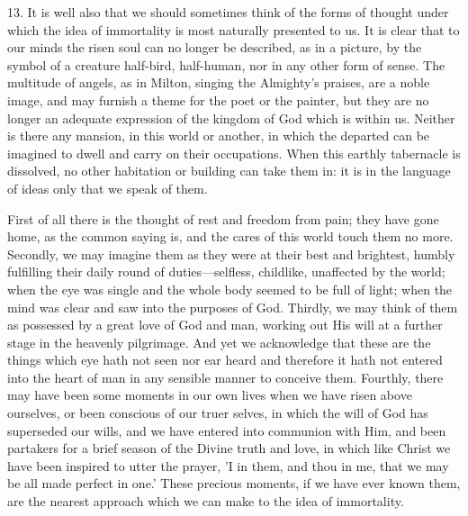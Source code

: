 \documentclass[11pt,letter]{article}
\begin{document}
\par  13. It is well also that we should sometimes think of the forms of thought under which the idea of immortality is most naturally presented to us. It is clear that to our minds the risen soul can no longer be described, as in a picture, by the symbol of a creature half-bird, half-human, nor in any other form of sense. The multitude of angels, as in Milton, singing the Almighty's praises, are a noble image, and may furnish a theme for the poet or the painter, but they are no longer an adequate expression of the kingdom of God which is within us. Neither is there any mansion, in this world or another, in which the departed can be imagined to dwell and carry on their occupations. When this earthly tabernacle is dissolved, no other habitation or building can take them in: it is in the language of ideas only that we speak of them.

\par  First of all there is the thought of rest and freedom from pain; they have gone home, as the common saying is, and the cares of this world touch them no more. Secondly, we may imagine them as they were at their best and brightest, humbly fulfilling their daily round of duties—selfless, childlike, unaffected by the world; when the eye was single and the whole body seemed to be full of light; when the mind was clear and saw into the purposes of God. Thirdly, we may think of them as possessed by a great love of God and man, working out His will at a further stage in the heavenly pilgrimage. And yet we acknowledge that these are the things which eye hath not seen nor ear heard and therefore it hath not entered into the heart of man in any sensible manner to conceive them. Fourthly, there may have been some moments in our own lives when we have risen above ourselves, or been conscious of our truer selves, in which the will of God has superseded our wills, and we have entered into communion with Him, and been partakers for a brief season of the Divine truth and love, in which like Christ we have been inspired to utter the prayer, 'I in them, and thou in me, that we may be all made perfect in one.' These precious moments, if we have ever known them, are the nearest approach which we can make to the idea of immortality.
\end{document}
